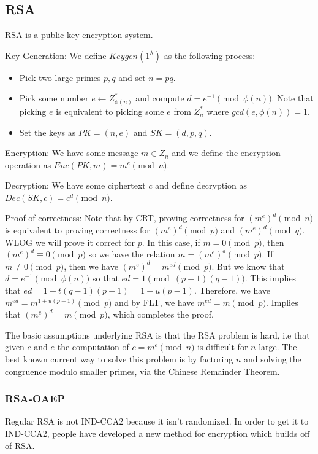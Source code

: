 \documentclass[psamsfonts]{amsart}
\begin{document}
\subsection{RSA}

RSA is a public key encryption system.

Key Generation: We define $Keygen(1^\lambda)$ as the following process:
\begin{itemize}
  \item Pick two large primes $p,q$ and set $n = pq$.
  \item Pick some number $e \leftarrow Z_{\phi(n)}^*$ and compute $d = e^{-1} \pmod{\phi(n)}$. Note that picking $e$ is equivalent to picking some $e$ from $Z_n^*$ where $gcd(e, \phi(n)) = 1$.
  \item Set the keys as $PK = (n, e)$ and $SK = (d, p, q)$.
\end{itemize}

Encryption: We have some message $m \in Z_n$ and we define the encryption operation as $Enc(PK, m) = m^e \pmod{n}$.

Decryption: We have some ciphertext $c$ and define decryption as $Dec(SK, c) = c^d \pmod{n}$.

Proof of correctness: Note that by CRT, proving correctness for $(m^e)^d \pmod{n}$ is equivalent to proving correctness for $(m^e)^d \pmod{p}$ and $(m^e)^d \pmod{q}$. WLOG we will prove it correct for $p$. In this case, if $m = 0 \pmod{p}$, then $(m^e)^d \equiv 0 \pmod{p}$ so we have the relation $m = (m^e)^d \pmod{p}$. If $m \neq 0 \pmod{p}$, then we have $(m^e)^d = m^{ed} \pmod{p}$. But we know that $d = e^{-1} \pmod{\phi(n)}$ so that $ed = 1 \pmod{(p-1)(q-1)}$. This implies that $ed = 1 + t(q-1)(p-1) = 1 + u(p-1)$. Therefore, we have $m^{ed} = m^{1+u(p-1)} \pmod{p}$ and by FLT, we have $m^{ed} = m \pmod{p}$. Implies that $(m^e)^d = m \pmod{p}$, which completes the proof.

The basic assumptions underlying RSA is that the RSA problem is hard, i.e that given $c$ and $e$ the computation of $c = m^e \pmod{n}$ is difficult for $n$ large. The best known current way to solve this problem is by factoring $n$ and solving the congruence modulo smaller primes, via the Chinese Remainder Theorem.

\subsubsection{RSA-OAEP}

Regular RSA is not IND-CCA2 because it isn't randomized. In order to get it to IND-CCA2, people have developed a new method for encryption which builds off of RSA.
\end{document}
